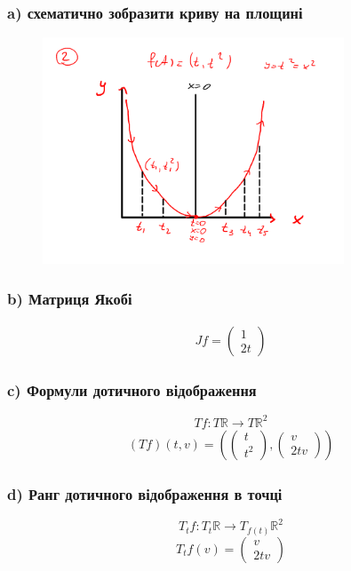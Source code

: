 \documentclass[10pt, a4paper]{article} %
\newcommand{\R}{\mathbb{R}}
\begin{document}
\subsubsection*{a) схематично зобразити криву на площині}
\begin{figure}[h]
    \includegraphics[width=0.8\textwidth]{1.7.2.png}
    \centering
\end{figure}


\subsubsection*{b) Матриця Якобі}
\begin{align*}
    Jf = \begin{pmatrix}
        1 \\ 2t
    \end{pmatrix}
\end{align*}

\subsubsection*{c) Формули дотичного відображення}
\[Tf : T\R \to T\R^2\]
\begin{align*}
    (Tf)(t, v) = \left(\begin{pmatrix}
        t \\ t^2
    \end{pmatrix}, \begin{pmatrix}
        v \\ 2tv
    \end{pmatrix}\right)
\end{align*}

\subsubsection*{d) Ранг дотичного відображення в точці}
\[T_{t}f: T_{t}\R \to T_{f(t)}\R^2\]
\[T_{t}f(v) = \begin{pmatrix}
    v \\ 2tv
\end{pmatrix}\]
\end{document}
